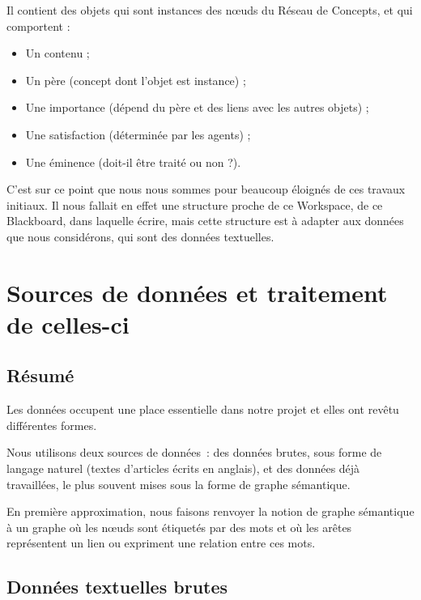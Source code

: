 \documentclass[a4paper, 12pt]{article}
\begin{document}
Il contient des objets qui sont instances des n\oe{}uds du Réseau de Concepts, et qui comportent :
\begin{itemize}
 \item Un contenu ;
 \item Un père (concept dont l'objet est instance) ;
 \item Une importance (dépend du père et des liens avec les autres objets) ;
 \item Une satisfaction (déterminée par les agents) ;
 \item Une éminence (doit-il être traité ou non ?).
\end{itemize}

C'est sur ce point que nous nous sommes pour beaucoup éloignés de ces travaux initiaux. Il nous fallait en effet une structure proche de ce Workspace, de ce Blackboard, dans laquelle écrire, mais cette structure est à adapter aux données que nous considérons, qui sont des données textuelles.


\section{Sources de données et traitement de celles-ci}\label{Section:sources}

\subsection{Résumé}

Les données occupent une place essentielle dans notre projet et elles ont revêtu différentes formes.

Nous utilisons deux sources de données~: des données brutes, sous forme de langage naturel (textes d'articles écrits en anglais), et des données déjà travaillées, le plus souvent mises sous la forme de graphe sémantique.

\begin{definition}
En première approximation, nous faisons renvoyer la notion de graphe sémantique à un graphe où les nœuds sont étiquetés par des mots et où les arêtes représentent un lien ou expriment une relation entre ces mots.
\end{definition}


\subsection{Données textuelles brutes}
\end{document}
